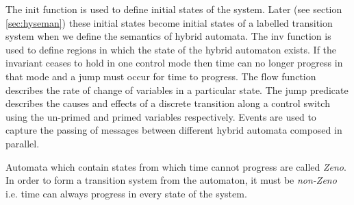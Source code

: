 \medskip
The $\mathrm{init}$ function is used to define initial states of the system. Later (see section \ref{sec:hyseman}) these initial states become initial states of a labelled transition system when we define the semantics of hybrid automata. The $\mathrm{inv}$ function is used to define regions in which the state of the hybrid automaton exists. If the invariant ceases to hold in one control mode then time can no longer progress in that mode and a jump must occur for time to progress. The $\mathrm{flow}$ function describes the rate of change of variables in a particular state. The $\mathrm{jump}$ predicate describes the causes and effects of a discrete transition along a control switch using the un-primed and primed variables respectively.  Events are used to capture the passing of messages between different hybrid automata composed in parallel.
\begin{comment}
For example, when we define our train control system it is desired that the S of the train is $0$, initially and that remains invariant throughout execution of the automaton $init(Stopped) := invar(Stopped) := S = 0$ , which is captured by the initial predicate $init(Stopped) := S = 0$.  It is also desirable in the states Accelerating and Full Speed that the braking distance is less than or equal to the distance between the train and the end of movement authority $inv(Acc) := inv(Full Speed) := BD(S) \leq DMA(D, EoA)$. The invariant acts as a boundary condition which specifies the limits of the automatons behaviour. In the case of the Full Speed and Accelerating states it ensures that the train can always brake in time and it forces the automaton to perform a transition to the braking state when the boundary of the invariant is reached . If some some reason the system flows into one of these boundaries and no discrete change can occur then time is prevented from continuing.  \end{comment}

Automata which contain states from which time cannot progress are called \emph{Zeno}. In order to form a transition system from the automaton, it must be \emph{non-Zeno} i.e. time can always progress in every state of the system. 
\medskip
\begin{comment}
 In the following specification events are used to pass messages between different automata placed in parallel. An example event is that of $event(Stopped \to Accelerating) :=MA.x.y \ \textbf{if} \ x = TrainID \ \textbf{then} \ EoA' := y$ which is triggered by the RBC and causes the train to update the value of its movement authority. Flow conditions describe the rate of change of a given variable over time. In our formalisation of a train one such flow condition is $flow(Accelerating) := \dot{S} = 1$ which causes the train to accelerate at a S of one unit per unit of time.
\end{comment}

